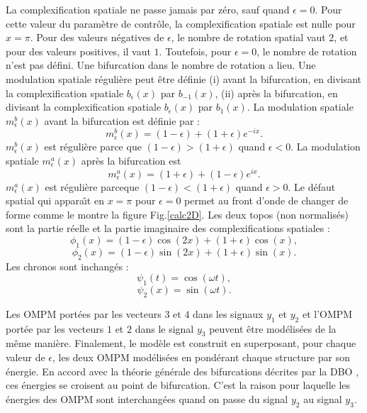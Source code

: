 \documentclass{book}
\begin{document}
La complexification spatiale ne passe jamais par z\'ero, sauf quand
$\epsilon=0$. Pour cette valeur du param\`etre de contr\^ole, la
complexification spatiale est nulle pour $x=\pi$. Pour des valeurs
n\'egatives de $\epsilon$, le nombre de rotation  spatial vaut $2$, et
pour des valeurs positives, il vaut $1$. Toutefois, pour $\epsilon=0$,
le nombre de rotation n'est pas d\'efini. Une bifurcation dans le
nombre de rotation a lieu.
Une modulation spatiale 
r\'eguli\`ere
peut \^etre d\'efinie (i) avant
la bifurcation, en divisant la complexification spatiale
$b_{\epsilon}(x)$ par $b_{-1}(x)$, (ii) apr\`es la bifurcation, en
divisant la complexification spatiale $b_{\epsilon}(x)$ par
$b_{1}(x)$. 
La modulation spatiale $m^b_{\epsilon}(x)$ avant la bifurcation est
d\'efinie par : 
\begin{equation}
m^b_{\epsilon}(x)=(1-\epsilon)+(1+\epsilon)e^{-ix}.
\end{equation}
 $m^b_{\epsilon}(x)$ est r\'eguli\`ere parce que
$(1-\epsilon)>(1+\epsilon)$ quand $\epsilon<0$. La modulation spatiale
$m^a_{\epsilon}(x)$ apr\`es la bifurcation est
\begin{equation}
m^a_{\epsilon}(x)=(1+\epsilon)+(1-\epsilon)e^{ix}.
\end{equation}
$m^a_{\epsilon}(x)$ est r\'eguli\`ere parceque
$(1-\epsilon)<(1+\epsilon)$ quand $\epsilon>0$. Le d\'efaut spatial
qui appara\^\i t en $x=\pi$ pour $\epsilon=0$ permet au front d'onde
de changer de forme comme le montre la figure Fig.\ref{calc2D}.
Les deux topos (non normalis\'es) sont la partie r\'eelle et
la partie imaginaire des complexifications spatiales :
\begin{equation}
\phi_1(x)=(1-\epsilon)\cos(2x)+(1+\epsilon)\cos(x),
\end{equation}
\begin{equation}
\phi_2(x)=(1-\epsilon)\sin(2x)+(1+\epsilon)\sin(x).
\end{equation}
Les chronos sont inchang\'es :
\begin{equation}
\psi_1(t)=\cos(\omega t),
\end{equation}
\begin{equation}
\psi_2(x)=\sin(\omega t).
\end{equation}


Les OMPM port\'ees par les vecteurs $3$ et $4$ dans les signaux $y_1$
et $y_2$ et l'OMPM port\'ee par les vecteurs $1$ et $2$ dans le signal
$y_3$ peuvent \^etre mod\'elis\'ees de la m\^eme mani\`ere.
Finalement, le mod\`ele est construit en superposant, pour chaque
valeur de $\epsilon$, les deux OMPM mod\'elis\'ees en pond\'erant chaque
structure par son \'energie. En accord avec la
th\'eorie g\'en\'erale des bifurcations d\'ecrites par la DBO
\cite{Aubry92}, ces \'energies se croisent au point de bifurcation.
C'est la raison pour laquelle les \'energies des OMPM sont
interchang\'ees quand on passe du signal $y_2$ au signal $y_3$.
\end{document}
